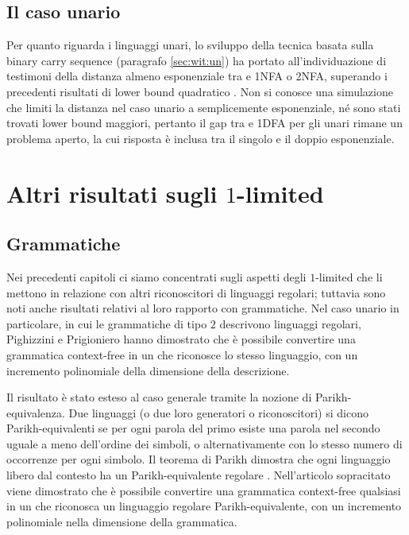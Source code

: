 \subsection{Il caso unario}
Per quanto riguarda i linguaggi unari, lo sviluppo della tecnica basata sulla binary carry sequence (paragrafo \ref{sec:wit:un}) ha portato all'individuazione di testimoni della distanza almeno esponenziale tra  e 1NFA o 2NFA, superando i precedenti risultati di lower bound quadratico \cite{Pighizzini:14:limitedRE}. Non si conosce una simulazione che limiti la distanza nel caso unario a semplicemente esponenziale, né sono stati trovati lower bound maggiori, pertanto il gap tra  e 1DFA per gli unari rimane un problema aperto, la cui risposta è inclusa tra il singolo e il doppio esponenziale.



\section{Altri risultati sugli \texorpdfstring{$1$-limited}{1-limited}}


\subsection{Grammatiche}
Nei precedenti capitoli ci siamo concentrati sugli aspetti degli $1$-limited che li mettono in relazione con altri riconoscitori di linguaggi regolari; tuttavia sono noti anche risultati relativi al loro rapporto con grammatiche. Nel caso unario in particolare, in cui le grammatiche di tipo $2$ descrivono linguaggi regolari, Pighizzini e Prigioniero hanno dimostrato \cite{Pighizzini:19:limitedunary} che è possibile convertire una grammatica context-free in un  che riconosce lo stesso linguaggio, con un incremento polinomiale della dimensione della descrizione.

Il risultato è stato esteso al caso generale tramite la nozione di Parikh-equivalenza. Due linguaggi (o due loro generatori o riconoscitori) si dicono Parikh-equivalenti se per ogni parola del primo esiste una parola nel secondo uguale a meno dell'ordine dei simboli, o alternativamente con lo stesso numero di occorrenze per ogni simbolo. Il teorema di Parikh dimostra che ogni linguaggio libero dal contesto ha un Parikh-equivalente regolare \cite{Parikh:66:CF}. Nell'articolo sopracitato viene dimostrato che è possibile convertire una grammatica context-free qualsiasi in un  che riconosca un linguaggio regolare Parikh-equivalente, con un incremento polinomiale nella dimensione della grammatica.


